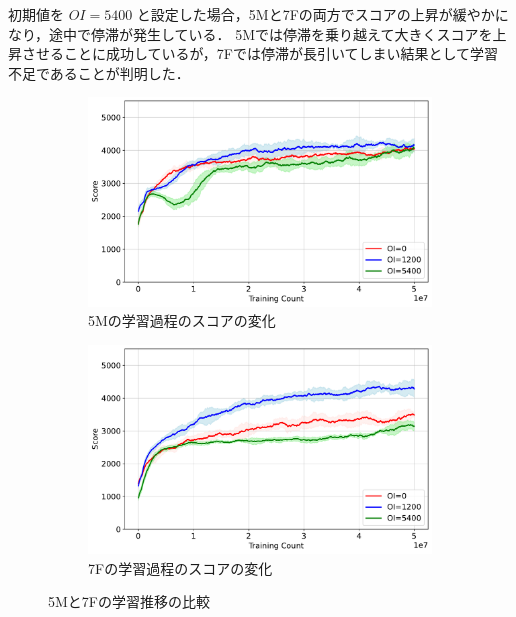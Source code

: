 初期値を $\mathit{OI}=5400$ と設定した場合，\textsf{5M}と\textsf{7F}の両方でスコアの上昇が緩やかになり，途中で停滞が発生している．
\textsf{5M}では停滞を乗り越えて大きくスコアを上昇させることに成功しているが，\textsf{7F}では停滞が長引いてしまい結果として学習不足であることが判明した．

\begin{figure}[t]
    \centering
    \begin{subfigure}[b]{\linewidth}
        \centering
        \includegraphics[width=\linewidth]{pdf/learning_progress_plots/learning_progress_NT5M_tuple298_combined.pdf}
        \caption{5Mの学習過程のスコアの変化}
        \label{fig:learning_progress_NT5M}
    \end{subfigure}

    \vspace{1em}
    \begin{subfigure}[b]{\linewidth}
        \centering
        \includegraphics[width=\linewidth]{pdf/learning_progress_plots/learning_progress_NT7F_tuple0_combined.pdf}
        \caption{7Fの学習過程のスコアの変化}
        \label{fig:learning_progress_NT7F}
    \end{subfigure}

    \caption{5Mと7Fの学習推移の比較}
    \label{fig:learning_progress_comparison}
\end{figure}

